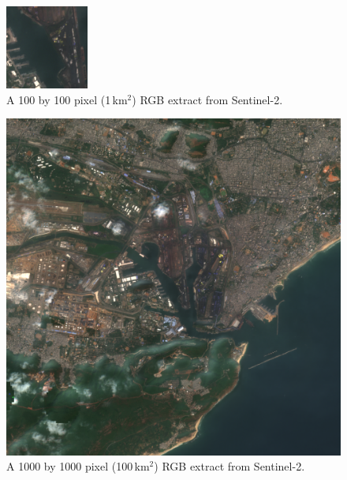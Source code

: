 \begin{figure}[ht]
    \centering
    \includegraphics[width=0.9\linewidth]{figures_sentinel/sample_100_pixelside.png}
    \caption{A 100 by 100 pixel (1\,km$^2$) RGB extract from Sentinel-2.}
    \label{fig:sample_100_pixelside}
\end{figure}

\begin{figure}[ht]
    \centering
    \includegraphics[width=0.9\linewidth]{figures_sentinel/sample_1000_pixelside.png}
    \caption{A 1000 by 1000 pixel (100\,km$^2$) RGB extract from Sentinel-2.}
    \label{fig:sample_1000_pixelside}
\end{figure}

